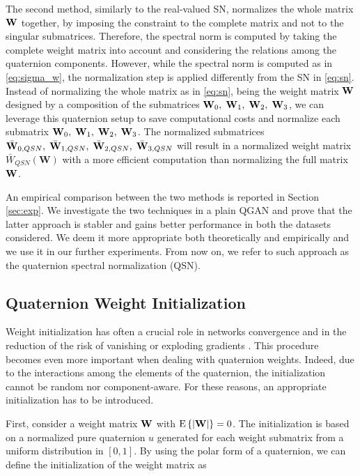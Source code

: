\documentclass[graybox]{svmult}
\begin{document}
The second method, similarly to the real-valued SN, normalizes the whole matrix ${\mathbf W}$ together, by imposing the constraint to the complete matrix and not to the singular submatrices. Therefore, the spectral norm is computed by taking the complete weight matrix into account and considering the relations among the quaternion components. However, while the spectral norm is computed as in \eqref{eq:sigma_w}, the normalization step is applied differently from the SN in \eqref{eq:sn}. Instead of normalizing the whole matrix as in \eqref{eq:sn}, being the weight matrix ${\mathbf W}$ designed by a composition of the submatrices ${\mathbf W}_0, \; {\mathbf W}_1, \; {\mathbf W}_2, \; {\mathbf W}_3$, we can leverage this quaternion setup to save computational costs and normalize each submatrix ${\mathbf W}_0, \; {\mathbf W}_1, \; {\mathbf W}_2, \; {\mathbf W}_3$. The normalized submatrices $\bar{{\mathbf W}}_{0,QSN}, \; \bar{{\mathbf W}}_{1,QSN}, \; \bar{{\mathbf W}}_{2,QSN}, \; \bar{{\mathbf W}}_{3,QSN}$ will result in a normalized weight matrix $\bar{W}_{QSN}(\mathbf{W})$ with a more efficient computation than normalizing the full matrix ${\mathbf W}$.

An empirical comparison between the two methods is reported in Section \ref{sec:exp}. We investigate the two techniques in a plain QGAN and prove that the latter approach is stabler and gains better performance in both the datasets considered. We deem it more appropriate both theoretically and empirically and we use it in our further experiments. From now on, we refer to such approach as the quaternion spectral normalization (QSN).












\subsection{Quaternion Weight Initialization}
\label{sec:qwi}
\noindent Weight initialization has often a crucial role in networks convergence and in the reduction of the risk of vanishing or exploding gradients \cite{GlorotInit2010}. This procedure becomes even more important when dealing with quaternion weights. Indeed, due to the interactions among the elements of the quaternion, the initialization cannot be random nor component-aware. For these reasons, an appropriate initialization has to be introduced.

First, consider a weight matrix ${\mathbf W}$ with $\text{E}\left\{|{\mathbf W}|\right\} = 0$. The initialization is based on a normalized pure quaternion $u$ generated for each weight submatrix from a uniform distribution in $[0, 1]$. By using the polar form of a quaternion, we can define the initialization of the weight matrix as
\end{document}
